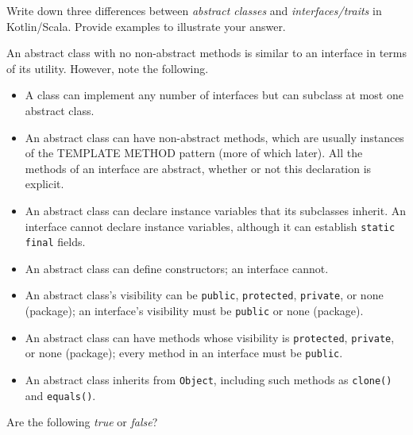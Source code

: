 \documentclass[answers,12pt,a4paper]{exam}
\begin{document}
\begin{questions}
\question %
Write down three differences between \emph{abstract classes} and \emph{interfaces/traits} in Kotlin/Scala.
Provide examples to illustrate your answer.

\begin{solution}
An abstract class with no non-abstract methods is similar to an interface in terms of its 
utility. However, note the following.
\begin{itemize}
\item
A class can implement any number of interfaces but can subclass at most one abstract class.
\item
An abstract class can have non-abstract methods, which are usually instances of the 
\textsc{TEMPLATE METHOD} pattern (more of which later). 
All the methods of an interface are abstract, whether or not this declaration is explicit.
\item
An abstract class can declare instance variables that its subclasses inherit. 
An interface cannot declare instance variables, although it can establish 
\verb!static final! fields.
\item
An abstract class can define constructors; an interface cannot.
\item
An abstract class's visibility can be \verb!public!, \verb!protected!, \verb!private!, 
or none (package); an interface's visibility must be \verb!public! or none (package).
\item
An abstract class can have methods whose visibility is \verb!protected!, 
\verb!private!, or none (package); every method in an interface must be \verb!public!.
\item
An abstract class inherits from \verb!Object!, including such methods as \verb!clone()! 
and \verb!equals()!.
\end{itemize}
\end{solution}

\question %
Are the following \emph{true} or \emph{false}? 

\end{questions}
\end{document}
